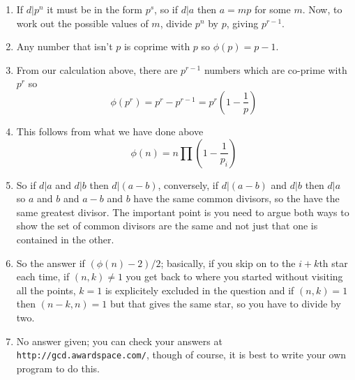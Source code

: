 \documentclass[12pt]{article}
\begin{document}
\begin{enumerate}
\item If $d|p^n$ it must be in the form $p^s$, so if $d|a$ then $a=mp$
  for some $m$. Now, to work out the possible values of $m$, divide $p^n$ by $p$, giving $p^{r-1}$.

\item Any number that isn't $p$ is coprime with $p$ so $\phi(p)=p-1$.

\item From our calculation above, there are $p^{r-1}$ numbers which are co-prime with $p^r$ so 
\begin{equation}
\phi(p^r)=p^r-p^{r-1}=p^r\left(1-\frac{1}{p}\right)
\end{equation}

\item This follows from what we have done above
\begin{equation}
\phi(n)=n \prod \left(1-\frac{1}{p_i}\right) 
\end{equation}

\item So if $d|a$ and $d|b$ then $d|(a-b)$, conversely, if $d|(a-b)$
  and $d|b$ then $d|a$ so $a$ and $b$ and $a-b$ and $b$ have the same
  common divisors, so the have the same greatest divisor. The
  important point is you need to argue both ways to show the set of
  common divisors are the same and not just that one is contained in
  the other.

\item So the answer if $(\phi(n)-2)/2$; basically, if you skip on to
  the $i+k$th star each time, if $(n,k)\not=1$ you get back to where
  you started without visiting all the points, $k=1$ is explicitely
  excluded in the question and if $(n,k)=1$ then $(n-k,n)=1$ but that
  gives the same star, so you have to divide by two.

\item No answer given; you can check your answers at
  \texttt{http://gcd.awardspace.com/}, though of course, it is best to
  write your own program to do this.


\end{enumerate}
\end{document}
